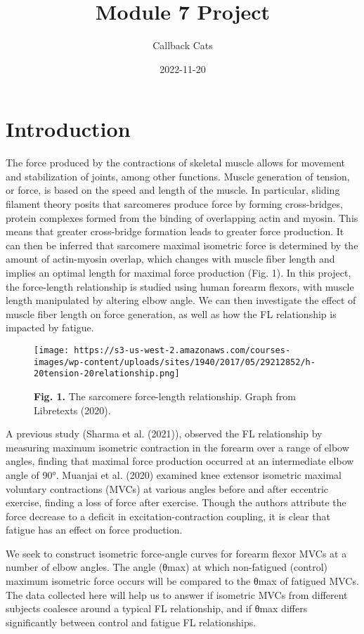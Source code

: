 \documentclass[
]{article}
\title{Module 7 Project}
\author{Callback Cats}
\date{2022-11-20}
\begin{document}
\maketitle

\hypertarget{introduction}{%
\section{Introduction}\label{introduction}}

The force produced by the contractions of skeletal muscle allows for
movement and stabilization of joints, among other functions. Muscle
generation of tension, or force, is based on the speed and length of the
muscle. In particular, sliding filament theory posits that sarcomeres
produce force by forming cross-bridges, protein complexes formed from
the binding of overlapping actin and myosin. This means that greater
cross-bridge formation leads to greater force production. It can then be
inferred that sarcomere maximal isometric force is determined by the
amount of actin-myosin overlap, which changes with muscle fiber length
and implies an optimal length for maximal force production (Fig. 1). In
this project, the force-length relationship is studied using human
forearm flexors, with muscle length manipulated by altering elbow angle.
We can then investigate the effect of muscle fiber length on force
generation, as well as how the FL relationship is impacted by fatigue.

\begin{figure}
\centering
\texttt{[image: https://s3-us-west-2.amazonaws.com/courses-images/wp-content/uploads/sites/1940/2017/05/29212852/h-20tension-20relationship.png]}
\caption{\textbf{Fig. 1.} The sarcomere force-length relationship. Graph
from Libretexts (2020).}
\end{figure}

A previous study (Sharma et al. (2021)), observed the FL relationship by
measuring maximum isometric contraction in the forearm over a range of
elbow angles, finding that maximal force production occurred at an
intermediate elbow angle of 90°. Muanjai et al. (2020) examined knee
extensor isometric maximal voluntary contractions (MVCs) at various
angles before and after eccentric exercise, finding a loss of force
after exercise. Though the authors attribute the force decrease to a
deficit in excitation-contraction coupling, it is clear that fatigue has
an effect on force production.

We seek to construct isometric force-angle curves for forearm flexor
MVCs at a number of elbow angles. The angle (θmax) at which non-fatigued
(control) maximum isometric force occurs will be compared to the θmax of
fatigued MVCs. The data collected here will help us to answer if
isometric MVCs from different subjects coalesce around a typical FL
relationship, and if θmax differs significantly between control and
fatigue FL relationships.
\end{document}
